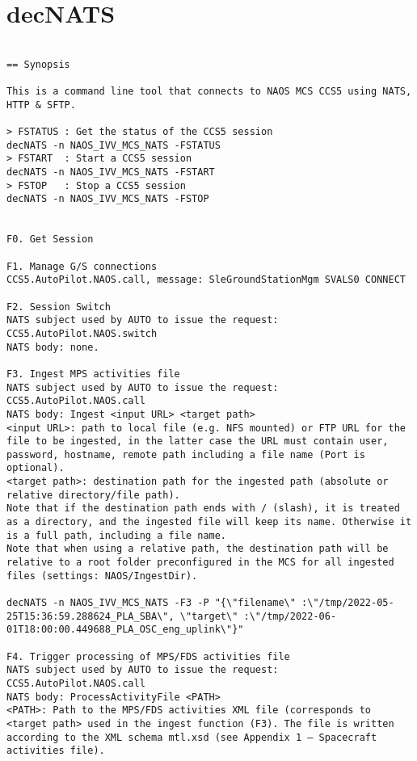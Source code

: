 \documentclass[dec_sum_main.tex]{subfiles}
\begin{document}
\label{decNATS}

\section{decNATS}

\begin{verbatim}

== Synopsis

This is a command line tool that connects to NAOS MCS CCS5 using NATS, HTTP & SFTP.

> FSTATUS : Get the status of the CCS5 session 
decNATS -n NAOS_IVV_MCS_NATS -FSTATUS
> FSTART  : Start a CCS5 session
decNATS -n NAOS_IVV_MCS_NATS -FSTART
> FSTOP   : Stop a CCS5 session
decNATS -n NAOS_IVV_MCS_NATS -FSTOP


F0. Get Session 

F1. Manage G/S connections
CCS5.AutoPilot.NAOS.call, message: SleGroundStationMgm SVALS0 CONNECT

F2. Session Switch
NATS subject used by AUTO to issue the request: CCS5.AutoPilot.NAOS.switch
NATS body: none.

F3. Ingest MPS activities file
NATS subject used by AUTO to issue the request: CCS5.AutoPilot.NAOS.call
NATS body: Ingest <input URL> <target path>
<input URL>: path to local file (e.g. NFS mounted) or FTP URL for the file to be ingested, in the latter case the URL must contain user, password, hostname, remote path including a file name (Port is optional).
<target path>: destination path for the ingested path (absolute or relative directory/file path).
Note that if the destination path ends with / (slash), it is treated as a directory, and the ingested file will keep its name. Otherwise it is a full path, including a file name.
Note that when using a relative path, the destination path will be relative to a root folder preconfigured in the MCS for all ingested files (settings: NAOS/IngestDir).

decNATS -n NAOS_IVV_MCS_NATS -F3 -P "{\"filename\" :\"/tmp/2022-05-25T15:36:59.288624_PLA_SBA\", \"target\" :\"/tmp/2022-06-01T18:00:00.449688_PLA_OSC_eng_uplink\"}"

F4. Trigger processing of MPS/FDS activities file
NATS subject used by AUTO to issue the request: CCS5.AutoPilot.NAOS.call
NATS body: ProcessActivityFile <PATH>
<PATH>: Path to the MPS/FDS activities XML file (corresponds to <target path> used in the ingest function (F3). The file is written according to the XML schema mtl.xsd (see Appendix 1 – Spacecraft activities file).


\end{verbatim}
\end{document}
